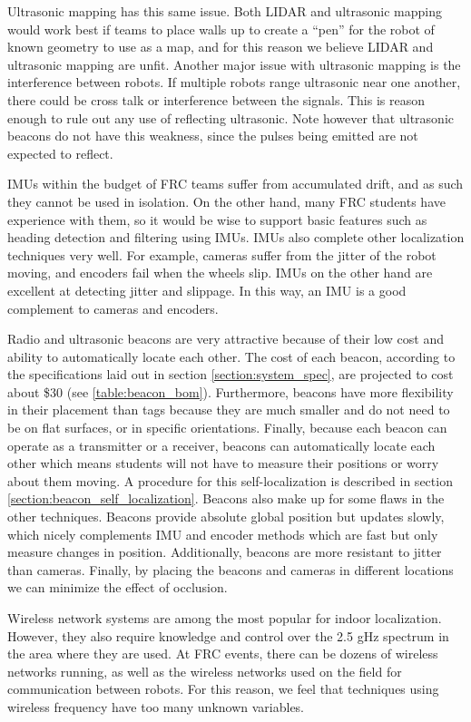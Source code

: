 \documentclass{article}
\begin{document}
  Ultrasonic mapping has this same issue. Both LIDAR and ultrasonic mapping would work best if teams to place walls up to create a ``pen'' for the robot of known geometry to use as a map, and for this reason we believe LIDAR and ultrasonic mapping are unfit. Another major issue with ultrasonic mapping is the interference between robots. If multiple robots range ultrasonic near one another, there could be cross talk or interference between the signals. This is reason enough to rule out any use of reflecting ultrasonic. Note however that ultrasonic beacons do not have this weakness, since the pulses being emitted are not expected to reflect.

  IMUs within the budget of FRC teams suffer from accumulated drift, and as such they cannot be used in isolation. On the other hand, many FRC students have experience with them, so it would be wise to support basic features such as heading detection and filtering using IMUs. IMUs also complete other localization techniques very well. For example, cameras suffer from the jitter of the robot moving, and encoders fail when the wheels slip. IMUs on the other hand are excellent at detecting jitter and slippage. In this way, an IMU is a good complement to cameras and encoders.

  Radio and ultrasonic beacons are very attractive because of their low cost and ability to automatically locate each other. The cost of each beacon, according to the specifications laid out in section \ref{section:system_spec}, are projected to cost about \$30 (see \ref{table:beacon_bom}). Furthermore, beacons have more flexibility in their placement than tags because they are much smaller and do not need to be on flat surfaces, or in specific orientations. Finally, because each beacon can operate as a transmitter or a receiver, beacons can automatically locate each other which means students will not have to measure their positions or worry about them moving. A procedure for this self-localization is described in section \ref{section:beacon_self_localization}. Beacons also make up for some flaws in the other techniques. Beacons provide absolute global position but updates slowly, which nicely complements IMU and encoder methods which are fast but only measure changes in position. Additionally, beacons are more resistant to jitter than cameras. Finally, by placing the beacons and cameras in different locations we can minimize the effect of occlusion.

  Wireless network systems are among the most popular for indoor localization. However, they also require knowledge and control over the 2.5 gHz spectrum in the area where they are used. At FRC events, there can be dozens of wireless networks running, as well as the wireless networks used on the field for communication between robots. For this reason, we feel that techniques using wireless frequency have too many unknown variables.
\end{document}

